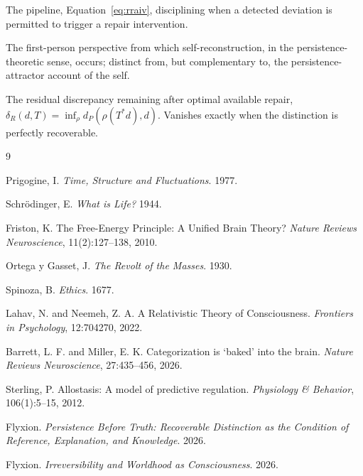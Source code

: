\documentclass[12pt]{article}
\begin{document}
\begin{description}[leftmargin=2.4cm, style=nextline]
\item[Record-Recognize-Interpret-Admit-Intervene-Verify (RRAIV)] The pipeline, Equation~\eqref{eq:rraiv}, disciplining when a detected deviation is permitted to trigger a repair intervention.

\item[Cognitive Frame of Reference] The first-person perspective from which self-reconstruction, in the persistence-theoretic sense, occurs; distinct from, but complementary to, the persistence-attractor account of the self.

\item[Repair Deficit] The residual discrepancy remaining after optimal available repair, $\delta_R(d,T) = \inf_\rho d_P(\rho(T^*d), d)$. Vanishes exactly when the distinction is perfectly recoverable.
\end{description}

\begin{thebibliography}{9}

Prigogine, I. \emph{Time, Structure and Fluctuations}. 1977.

Schr\"odinger, E. \emph{What is Life?} 1944.

Friston, K. The Free-Energy Principle: A Unified Brain Theory? \emph{Nature Reviews Neuroscience}, 11(2):127--138, 2010.

Ortega y Gasset, J. \emph{The Revolt of the Masses}. 1930.

Spinoza, B. \emph{Ethics}. 1677.

Lahav, N. and Neemeh, Z. A. A Relativistic Theory of Consciousness. \emph{Frontiers in Psychology}, 12:704270, 2022.

Barrett, L. F. and Miller, E. K. Categorization is `baked' into the brain. \emph{Nature Reviews Neuroscience}, 27:435--456, 2026.

Sterling, P. Allostasis: A model of predictive regulation. \emph{Physiology \& Behavior}, 106(1):5--15, 2012.

Flyxion. \emph{Persistence Before Truth: Recoverable Distinction as the Condition of Reference, Explanation, and Knowledge}. 2026.

Flyxion. \emph{Irreversibility and Worldhood as Consciousness}. 2026.

\end{thebibliography}
\end{document}
